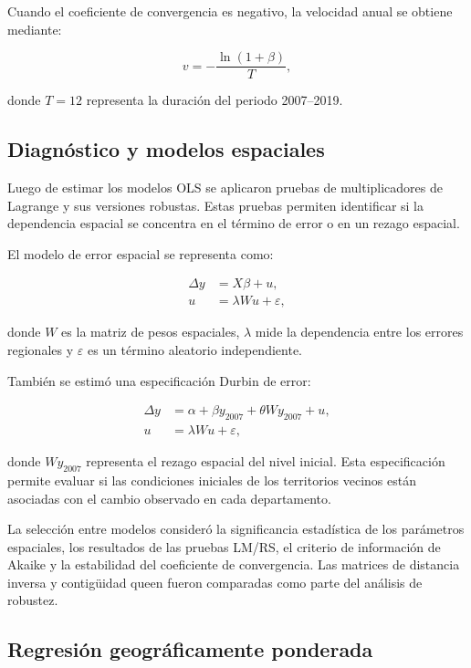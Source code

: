 Cuando el coeficiente de convergencia es negativo, la velocidad anual se
obtiene mediante:

\begin{equation}
v
=
-\frac{\ln(1+\beta)}{T},
\label{eq:velocidad_convergencia}
\end{equation}

donde $T=12$ representa la duración del periodo 2007--2019.

\subsection{Diagnóstico y modelos espaciales}

Luego de estimar los modelos OLS se aplicaron pruebas de multiplicadores de
Lagrange y sus versiones robustas. Estas pruebas permiten identificar si la
dependencia espacial se concentra en el término de error o en un rezago
espacial.

El modelo de error espacial se representa como:

\begin{align}
\Delta y
&=
X\beta+u, \\
u
&=
\lambda Wu+\varepsilon,
\label{eq:sem}
\end{align}

donde $W$ es la matriz de pesos espaciales, $\lambda$ mide la dependencia entre
los errores regionales y $\varepsilon$ es un término aleatorio independiente.

También se estimó una especificación Durbin de error:

\begin{align}
\Delta y
&=
\alpha
+
\beta y_{2007}
+
\theta Wy_{2007}
+
u, \\
u
&=
\lambda Wu+\varepsilon,
\label{eq:durbin_sem}
\end{align}

donde $Wy_{2007}$ representa el rezago espacial del nivel inicial. Esta
especificación permite evaluar si las condiciones iniciales de los territorios
vecinos están asociadas con el cambio observado en cada departamento.

La selección entre modelos consideró la significancia estadística de los
parámetros espaciales, los resultados de las pruebas LM/RS, el criterio de
información de Akaike y la estabilidad del coeficiente de convergencia. Las
matrices de distancia inversa y contigüidad queen fueron comparadas como parte
del análisis de robustez.

\subsection{Regresión geográficamente ponderada}

